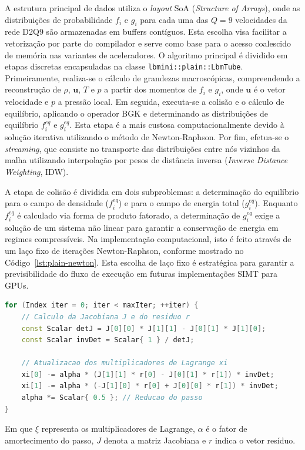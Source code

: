 A estrutura principal de dados utiliza o \textit{layout} SoA (\textit{Structure of Arrays}), onde as distribuições de probabilidade $f_i$ e $g_i$ para cada uma das $Q=9$ velocidades da rede D2Q9 são armazenadas em buffers contíguos.
Esta escolha visa facilitar a vetorização por parte do compilador e serve como base para o acesso coalescido de memória nas variantes de aceleradores.
O algoritmo principal é dividido em etapas discretas encapsuladas na classe \texttt{lbmini::plain::LbmTube}.
Primeiramente, realiza-se o cálculo de grandezas macroscópicas, compreendendo a reconstrução de $\rho$, $\mathbf{u}$, $T$ e $p$ a partir dos momentos de $f_i$ e $g_i$, onde $\mathbf{u}$ é o vetor velocidade e $p$ a pressão local.
Em seguida, executa-se a colisão e o cálculo de equilíbrio, aplicando o operador BGK e determinando as distribuições de equilíbrio $f_i^{eq}$ e $g_i^{eq}$.
Esta etapa é a mais custosa computacionalmente devido à solução iterativa utilizando o método de Newton-Raphson.
Por fim, efetua-se o \textit{streaming}, que consiste no transporte das distribuições entre nós vizinhos da malha utilizando interpolação por pesos de distância inversa (\textit{Inverse Distance Weighting}, IDW).

A etapa de colisão é dividida em dois subproblemas: a determinação do equilíbrio para o campo de densidade ($f_i^{eq}$) e para o campo de energia total ($g_i^{eq}$). Enquanto $f_i^{eq}$ é calculado via forma de produto fatorado, a determinação de $g_i^{eq}$ exige a solução de um sistema não linear para garantir a conservação de energia em regimes compressíveis.
Na implementação computacional, isto é feito através de um laço fixo de iterações Newton-Raphson, conforme mostrado no Código~\ref{lst:plain-newton}.
Esta escolha de laço fixo é estratégica para garantir a previsibilidade do fluxo de execução em futuras implementações SIMT para GPUs.
\begin{lstlisting}[language=C++, caption={Resolvedor Newton-Raphson para equilíbrio térmico.}, label={lst:plain-newton}, float=ht]
for (Index iter = 0; iter < maxIter; ++iter) {
    // Calculo da Jacobiana J e do residuo r
    const Scalar detJ = J[0][0] * J[1][1] - J[0][1] * J[1][0];
    const Scalar invDet = Scalar{ 1 } / detJ;

    // Atualizacao dos multiplicadores de Lagrange xi
    xi[0] -= alpha * (J[1][1] * r[0] - J[0][1] * r[1]) * invDet;
    xi[1] -= alpha * (-J[1][0] * r[0] + J[0][0] * r[1]) * invDet;
    alpha *= Scalar{ 0.5 }; // Reducao do passo
}
\end{lstlisting}
Em que $\xi$ representa os multiplicadores de Lagrange, $\alpha$ é o fator de amortecimento do passo, $J$ denota a matriz Jacobiana e $r$ indica o vetor resíduo.

